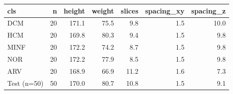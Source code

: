 \begin{tabular}{lrrrrrr}
\toprule
cls & n & height & weight & slices & spacing\_xy & spacing\_z \\
\midrule
DCM & 20 & 171.1 & 75.5 & 9.8 & 1.5 & 10.0 \\
HCM & 20 & 169.8 & 80.3 & 9.4 & 1.5 & 9.8 \\
MINF & 20 & 172.2 & 74.2 & 8.7 & 1.5 & 9.8 \\
NOR & 20 & 172.2 & 77.9 & 8.5 & 1.5 & 9.8 \\
ARV & 20 & 168.9 & 66.9 & 11.2 & 1.6 & 7.3 \\
Test (n=50) & 50 & 170.0 & 80.7 & 10.8 & 1.5 & 9.1 \\
\bottomrule
\end{tabular}
